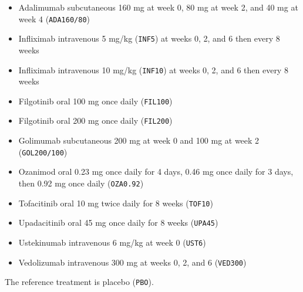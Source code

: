 \documentclass[
  letterpaper,
  DIV=11,
  numbers=noendperiod]{scrreprt}
\providecommand{\tightlist}{%
  \setlength{\itemsep}{0pt}\setlength{\parskip}{0pt}}\usepackage{longtable,booktabs,array}
\begin{document}
\begin{itemize}
\tightlist
\item
  Adalimumab subcutaneous 160 mg at week 0, 80 mg at week 2, and 40 mg
  at week 4 (\texttt{ADA160/80})
\item
  Infliximab intravenous 5 mg/kg (\texttt{INF5}) at weeks 0, 2, and 6
  then every 8 weeks
\item
  Infliximab intravenous 10 mg/kg (\texttt{INF10}) at weeks 0, 2, and 6
  then every 8 weeks
\item
  Filgotinib oral 100 mg once daily (\texttt{FIL100})
\item
  Filgotinib oral 200 mg once daily (\texttt{FIL200})
\item
  Golimumab subcutaneous 200 mg at week 0 and 100 mg at week 2
  (\texttt{GOL200/100})
\item
  Ozanimod oral 0.23 mg once daily for 4 days, 0.46 mg once daily for 3
  days, then 0.92 mg once daily (\texttt{OZA0.92})
\item
  Tofacitinib oral 10 mg twice daily for 8 weeks (\texttt{TOF10})
\item
  Upadacitinib oral 45 mg once daily for 8 weeks (\texttt{UPA45})
\item
  Ustekinumab intravenous 6 mg/kg at week 0 (\texttt{UST6})
\item
  Vedolizumab intravenous 300 mg at weeks 0, 2, and 6 (\texttt{VED300})
\end{itemize}

The reference treatment is placebo (\texttt{PBO}).
\end{document}
